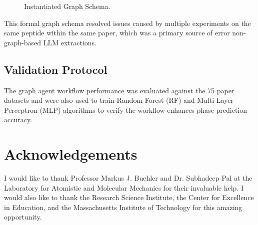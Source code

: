 \begin{figure}[htb]
    \centering
    \caption{Instantiated Graph Schema.}
    \label{fig:schema}
\end{figure}

This formal graph schema resolved issues caused by multiple experiments on the same peptide within the same paper, which was a primary source of error non-graph-based LLM extractions. 

\subsection{Validation Protocol}
The graph agent workflow performance was evaluated against the 75 paper datasets and were also used to train Random Forest (RF) and Multi-Layer Perceptron (MLP) algorithms to verify the workflow enhances phase prediction accuracy.

\section{Acknowledgements}
I would like to thank Professor Markus J. Buehler and Dr. Subhadeep Pal at the Laboratory for Atomistic and Molecular Mechanics for their invaluable help. I would also like to thank the Research Science Institute, the Center for Excellence in Education, and the Massachusetts Institute of Technology for this amazing opportunity.